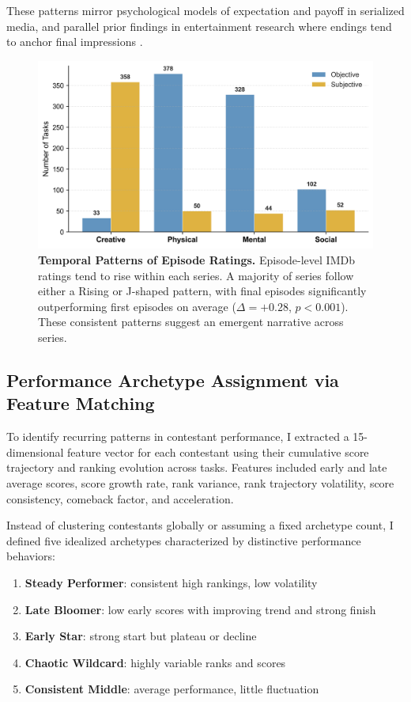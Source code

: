 \documentclass[10pt,letterpaper]{article}
\begin{document}
These patterns mirror psychological models of expectation and payoff in serialized media, and parallel prior findings in entertainment research where endings tend to anchor final impressions \cite{Fredrickson1993, Vorderer2004, Rozin2004}.

\begin{figure}[!h]
\centering
\includegraphics[width=\linewidth]{FiguresPNG/Fig6.png}
\caption{{\bf Temporal Patterns of Episode Ratings.}
Episode-level IMDb ratings tend to rise within each series. A majority of series follow either a Rising or J-shaped pattern, with final episodes significantly outperforming first episodes on average ($\Delta = +0.28$, $p < 0.001$). These consistent patterns suggest an emergent narrative across series.}
\label{fig:episode_trajectories}
\end{figure}
\FloatBarrier

\subsection*{Performance Archetype Assignment via Feature Matching}

To identify recurring patterns in contestant performance, I extracted a 15-dimensional feature vector for each contestant using their cumulative score trajectory and ranking evolution across tasks. Features included early and late average scores, score growth rate, rank variance, rank trajectory volatility, score consistency, comeback factor, and acceleration.

Instead of clustering contestants globally or assuming a fixed archetype count, I defined five idealized archetypes characterized by distinctive performance behaviors:
\begin{enumerate}
  \item \textbf{Steady Performer}: consistent high rankings, low volatility
  \item \textbf{Late Bloomer}: low early scores with improving trend and strong finish
  \item \textbf{Early Star}: strong start but plateau or decline
  \item \textbf{Chaotic Wildcard}: highly variable ranks and scores
  \item \textbf{Consistent Middle}: average performance, little fluctuation
\end{enumerate}
\end{document}

